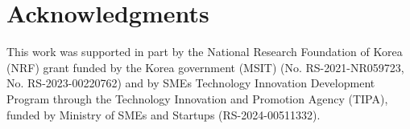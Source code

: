 \documentclass[a4paper,fleqn]{cas-sc}
\begin{document}
\section*{Acknowledgments}
This work was supported in part by the National Research Foundation of Korea (NRF) grant funded by the Korea government (MSIT) (No. RS-2021-NR059723, No. RS-2023-00220762) and by SMEs Technology Innovation Development Program through the Technology Innovation and Promotion Agency (TIPA), funded by Ministry of SMEs and Startups (RS-2024-00511332).

%





\end{document}
